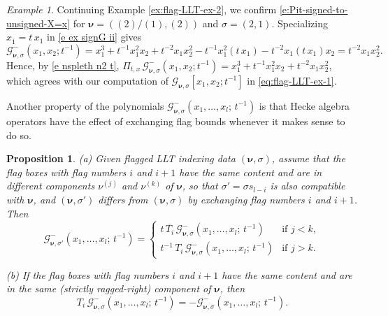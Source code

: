 \documentclass[12pt]{amsart}
\newtheorem{prop}[thm]{Proposition}
\theoremstyle{definition}
\theoremstyle{remark}
\newtheorem{example}[thm]{Example}
\newcommand{\nubold}{{\boldsymbol \nu }}
\newcommand{\Gcal}{{\mathcal G}}
\begin{document}
\begin{example}\label{ex:signed-llts}
Continuing Example \ref{ex:flag-LLT-ex-2}, we confirm
\eqref{e:Pit-signed-to-unsigned-X=x} for $\nubold = ((2)/(1), (2))$
and $\sigma = (2,1)$.  Specializing $x_{\overline{1}} = t \, x_1$ in
\eqref{e ex signG ii} gives
\begin{equation}
\Gcal_{\nubold,\sigma}^-(x_1,x_2;t^{-1}) =x_1^3 + t^{-1} x_1^2 x_2 +
t^{-2} x_1 x_2^2 - t^{-1} x_1^2 (t\, x_1) - t^{-2} x_1 (t \, x_1) x_2
= t^{-2} x_1 x_2^2.
\end{equation}
Hence, by \eqref{e nspleth n2 t}, \(\Pi_{t,x} \,
\Gcal_{\nubold,\sigma}^-(x_1,x_2;t^{-1}) = x_1^3 + t^{-1} x_1^2 x_2 +
t^{-2}x_1 x_2^2\), which agrees with our computation of
$\Gcal_{\nubold,\sigma}[x_1, x_2; t^{-1}]$ in
\eqref{eq:flag-LLT-ex-1}.
\end{example}


Another property of the polynomials $\Gcal _{\nubold ,\sigma
}^{-}(x_{1},\ldots,x_{l};\, t^{-1})$ is that Hecke algebra operators
have the effect of exchanging flag bounds whenever it makes sense to
do so.

\begin{prop}\label{prop:Ti-action}
(a) Given flagged LLT indexing data $(\nubold ,\sigma )$, assume that
the flag boxes with flag numbers $i$ and $i+1$ have the same content
and are in different components $\nu ^{(j)}$ and $\nu ^{(k)}$ of
$\nubold $, so that $\sigma ' = \sigma s_{l-i}$ is also compatible
with $\nubold $, and $(\nubold , \sigma ')$ differs from $(\nubold
,\sigma )$ by exchanging flag numbers $i$ and $i+1$.  Then
\begin{equation}\label{e:Ti-action-a}
\Gcal _{\nubold ,\sigma ' }^{-}(x_{1},\ldots,x_{l};\, t^{-1}) =
\begin{cases}
t\, \overline{T_{i}}\, \Gcal _{\nubold ,\sigma}^{-}(x_{1}, \ldots,
x_{l};\, t^{-1})& \text{if $j<k$},\\[1ex]
t^{-1} \, T_{i} \, \Gcal _{\nubold ,\sigma}^{-}(x_{1},\ldots,x_{l};\,
t^{-1})& \text{if $j>k$}.
\end{cases}
\end{equation}

(b) If the flag boxes with flag numbers $i$ and $i+1$ have the same
content and are in the same (strictly ragged-right) component of
$\nubold $, then
\begin{equation}\label{e:Ti-action-b}
T_{i}\, \Gcal _{\nubold ,\sigma }^{-}(x_{1},\ldots,x_{l};\, t^{-1}) =
- \Gcal _{\nubold ,\sigma }^{-}(x_{1},\ldots,x_{l};\, t^{-1}).
\end{equation}
\end{prop}
\end{document}
